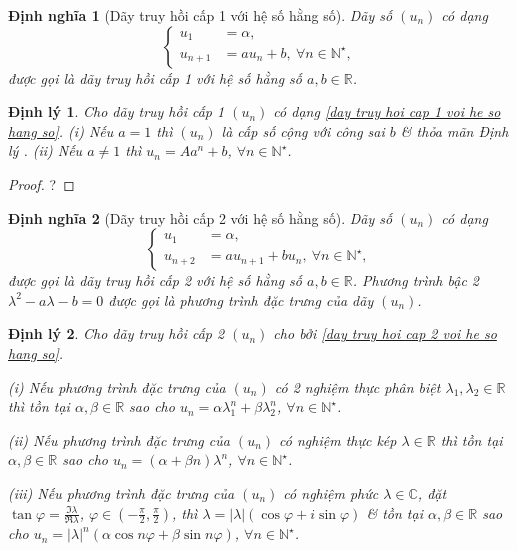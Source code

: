 \documentclass{article}
\newtheorem{dinhly}{Định lý}
\newtheorem{dinhnghia}{Định nghĩa}
\begin{document}
\begin{dinhnghia}[Dãy truy hồi cấp 1 với hệ số hằng số]
	Dãy số $(u_n)$ có dạng
	\begin{equation}
		\label{day truy hoi cap 1 voi he so hang so}
		\left\{\begin{split}
			u_1 &= \alpha,\\
			u_{n+1} &= au_n + b,\ \forall n\in\mathbb{N}^\star,
		\end{split}\right.
	\end{equation}
	được gọi là {\rm dãy truy hồi cấp 1 với hệ số hằng số} $a,b\in\mathbb{R}$.
\end{dinhnghia}

\begin{dinhly}
	Cho dãy truy hồi cấp 1 $(u_n)$ có dạng \eqref{day truy hoi cap 1 voi he so hang so}. (i) Nếu $a = 1$ thì $(u_n)$ là cấp số cộng với công sai $b$ \& thỏa mãn Định lý . (ii) Nếu $a\ne1$ thì $u_n = Aa^n + b$, $\forall n\in\mathbb{N}^\star$.
\end{dinhly}

\begin{proof}
	?
\end{proof}

\begin{dinhnghia}[Dãy truy hồi cấp 2 với hệ số hằng số]
	Dãy số $(u_n)$ có dạng
	\begin{equation}
		\label{day truy hoi cap 2 voi he so hang so}
		\left\{\begin{split}
			u_1 &= \alpha,\\
			u_{n+2} &= au_{n+1} + bu_n,\ \forall n\in\mathbb{N}^\star,
		\end{split}\right.
	\end{equation}
	được gọi là {\rm dãy truy hồi cấp 2 với hệ số hằng số} $a,b\in\mathbb{R}$. Phương trình bậc 2 $\lambda^2 - a\lambda - b = 0$ được gọi là {\rm phương trình đặc trưng} của dãy $(u_n)$.
\end{dinhnghia}

\begin{dinhly}
	Cho dãy truy hồi cấp 2 $(u_n)$ cho bởi \eqref{day truy hoi cap 2 voi he so hang so}.
	\item(i) Nếu phương trình đặc trưng của $(u_n)$ có 2 nghiệm thực phân biệt $\lambda_1,\lambda_2\in\mathbb{R}$ thì tồn tại $\alpha,\beta\in\mathbb{R}$ sao cho $u_n = \alpha\lambda_1^n + \beta\lambda_2^n$, $\forall n\in\mathbb{N}^\star$.
	\item(ii) Nếu phương trình đặc trưng của $(u_n)$ có nghiệm thực kép $\lambda\in\mathbb{R}$ thì tồn tại $\alpha,\beta\in\mathbb{R}$ sao cho $u_n = (\alpha + \beta n)\lambda^n$, $\forall n\in\mathbb{N}^\star$.
	\item(iii) Nếu phương trình đặc trưng của $(u_n)$ có nghiệm phức $\lambda\in\mathbb{C}$, đặt $\tan\varphi = \frac{\Im\lambda}{\Re\lambda}$, $\varphi\in\left(-\frac{\pi}{2},\frac{\pi}{2}\right)$, thì $\lambda = |\lambda|(\cos\varphi + i\sin\varphi)$ \& tồn tại $\alpha,\beta\in\mathbb{R}$ sao cho $u_n = |\lambda|^n(\alpha\cos n\varphi + \beta\sin n\varphi)$, $\forall n\in\mathbb{N}^\star$.
\end{dinhly}
\end{document}
